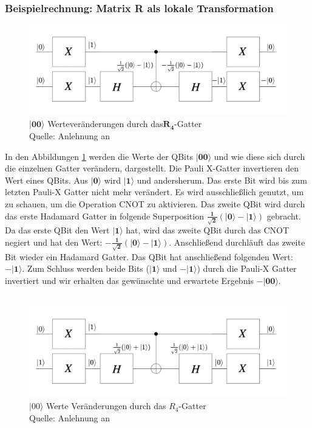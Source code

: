 \subsubsection{Beispielrechnung: Matrix R als lokale Transformation}
\begin{figure}[hbtp]
	\centering
	\includegraphics[width=.8\textwidth]{figures/RGatter00.png}
	\caption{$\mathbf{|00\rangle}$ Werteveränderungen durch das$\mathbf{R_4}$-Gatter \\ Quelle: Anlehnung an \cite[S. 145]{Ho17}}
	\label{fig:Rgatter00}
\end{figure}
In den Abbildungen \ref{fig:Rgatter00} werden die Werte der QBits $\mathbf{|00\rangle}$ und wie diese sich durch die einzelnen Gatter verändern, dargestellt.
Die Pauli X-Gatter invertieren den Wert eines QBits. Aus $\mathbf{|0\rangle}$ wird $\mathbf{|1\rangle}$ und andersherum. Das erste Bit wird bis zum letzten Pauli-X Gatter nicht mehr verändert. Es wird ausschließlich genutzt, um zu schauen, um die Operation CNOT zu aktivieren. Das zweite QBit wird durch das erste Hadamard Gatter in folgende Superposition $\mathbf{\frac{1}{\sqrt 2}(|0\rangle - |1\rangle)}$ gebracht. Da das erste QBit den Wert $\mathbf{|1\rangle}$ hat, wird das zweite QBit durch das CNOT negiert und hat den Wert: $\mathbf{-\frac{1}{\sqrt 2}(|0\rangle - |1\rangle)}$. Anschließend durchläuft das zweite Bit wieder ein Hadamard Gatter. Das QBit hat anschließend folgenden Wert: $\mathbf{-|1\rangle}$.
Zum Schluss werden beide Bits ($\mathbf{|1\rangle}$ und $\mathbf{-|1\rangle}$) durch die Pauli-X Gatter invertiert und wir erhalten das gewünschte und erwartete Ergebnis $\mathbf{-|00\rangle}$.
\\
\\
\begin{figure}[hbtp]
	\centering
	\includegraphics[width=.8\textwidth]{figures/RGatter01.png}
	\caption{$|00\rangle$ Werte Veränderungen durch das $R_4$-Gatter \\ Quelle: Anlehnung an \cite[S. 145]{Ho17}}
	\label{fig:Rgatter01}
\end{figure}
